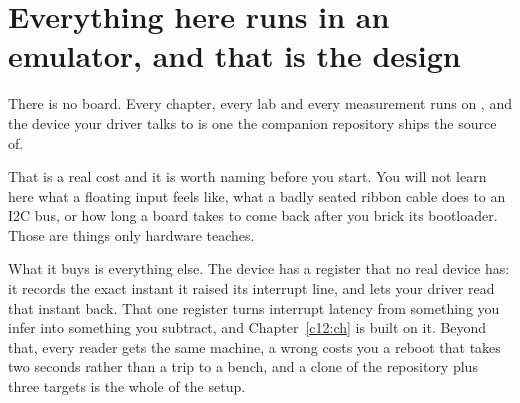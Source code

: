 \section*{Everything here runs in an emulator, and that is the design}
There is no board. Every chapter, every lab and every measurement runs on
, and the device your driver talks to is one the companion repository
ships the source of.

That is a real cost and it is worth naming before you start. You will not learn here what a
floating input feels like, what a badly seated ribbon cable does to an I2C bus, or how long a board
takes to come back after you brick its bootloader. Those are things only hardware teaches.

What it buys is everything else. The device has a register that no real device has: it records the
exact instant it raised its interrupt line, and lets your driver read that instant back. That one
register turns interrupt latency from something you infer into something you subtract, and
Chapter~\ref{c12:ch} is built on it. Beyond that, every reader gets the same machine, a wrong
 costs you a reboot that takes two seconds rather than a trip to a bench, and a clone
of the repository plus three  targets is the whole of the setup.

